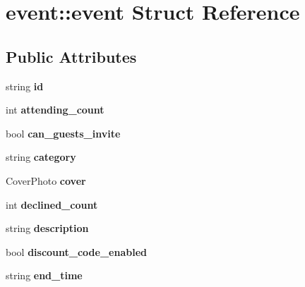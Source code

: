 \hypertarget{structevent_1_1event}{}\section{event\+:\+:event Struct Reference}
\label{structevent_1_1event}
\subsection*{Public Attributes}
\begin{DoxyCompactItemize}
\item 
\mbox{\label{structevent_1_1event_a471112259b428c638465a85f483a5d9b}} 
string {\bfseries id}
\item 
\mbox{\label{structevent_1_1event_a96ee855e1d5a547d5577141664d172e4}} 
int {\bfseries attending\+\_\+count}
\item 
\mbox{\label{structevent_1_1event_aae1c82e5521067133900ef8e1f2d9335}} 
bool {\bfseries can\+\_\+guests\+\_\+invite}
\item 
\mbox{\label{structevent_1_1event_acbaf7cb17407ec17f00c599612366120}} 
string {\bfseries category}
\item 
\mbox{\label{structevent_1_1event_a90505c8b453a9d9321685c6bd4ee49b8}} 
Cover\+Photo {\bfseries cover}
\item 
\mbox{\label{structevent_1_1event_a80752837fa9358ae86aa838accad315a}} 
int {\bfseries declined\+\_\+count}
\item 
\mbox{\label{structevent_1_1event_a7d13c9ef5c7c3b3cb67fecf6a6e9b54f}} 
string {\bfseries description}
\item 
\mbox{\label{structevent_1_1event_ae1428217c8f98f8f660b1976b5fbfa0a}} 
bool {\bfseries discount\+\_\+code\+\_\+enabled}
\item 
\mbox{\label{structevent_1_1event_a9e390e9973ef960e9abb9ff043e581e6}} 
string {\bfseries end\+\_\+time}
\item 

\end{DoxyCompactItemize}
